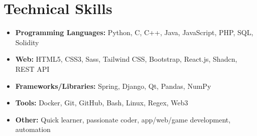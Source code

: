 
\section{\textbf{Technical Skills}}
\begin{itemize}[leftmargin=0.05in, label={}]
  \item \textbf{Programming Languages:} Python, C, C++, Java, JavaScript, PHP, SQL, Solidity
  \item \textbf{Web:} HTML5, CSS3, Sass, Tailwind CSS, Bootstrap, React.js, Shadcn, REST API
  \item \textbf{Frameworks/Libraries:} Spring, Django, Qt, Pandas, NumPy
  \item \textbf{Tools:} Docker, Git, GitHub, Bash, Linux, Regex, Web3
  \item \textbf{Other:} Quick learner, passionate coder, app/web/game development, automation
\end{itemize}

